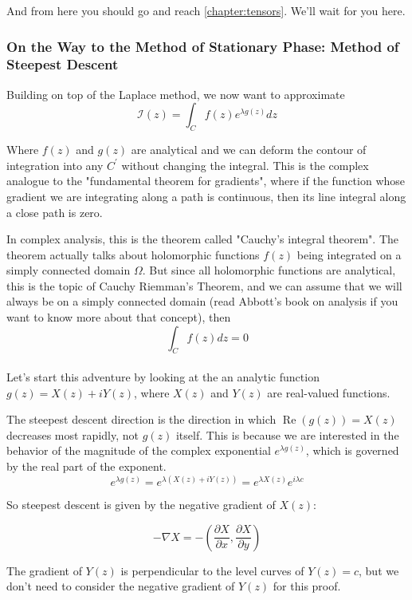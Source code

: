 And from here you should go and reach \ref{chapter:tensors}.
We'll wait for you here.




\subsubsection{On the Way to the Method of Stationary Phase: Method of Steepest Descent}

Building on top of the Laplace method, we now want to approximate
$$
\mathcal{I}(z) 
= \int_{C} f(z) e^{\lambda g(z)} dz
$$

Where $f(z)$ and $g(z)$ are analytical and we can deform the contour of integration
into any $C^\prime$ without changing the integral.
This is the complex analogue to the "fundamental theorem for gradients", where if the function whose gradient we are
integrating along a path is continuous, then its line integral along a close path is zero.

In complex analysis, this is the theorem called "Cauchy's integral theorem".
The theorem actually talks about holomorphic functions $f(z)$ being integrated on a simply connected
domain $\Omega$.
But since all holomorphic functions are analytical, this is the topic of Cauchy Riemman's Theorem,
and we can assume that we will always be on a simply connected domain (read Abbott's book on
analysis if you want to know more about that concept), then
$$
\int_{C} f(z) dz = 0
$$
\\



Let's start this adventure by looking at the an analytic function $g(z) = X(z) + iY(z)$,
where $X(z)$ and $Y(z)$ are real-valued functions.


The steepest descent direction is the direction in which $\operatorname{Re}(g(z)) = X(z)$
decreases most rapidly, not $g(z)$ itself.
This is because we are interested in the behavior of the magnitude of the complex exponential
$e^{\lambda g(z)}$, which is governed by the real part of the exponent.
$$
e^{\lambda g(z)} = e^{\lambda (X(z) + iY(z))} = e^{\lambda X(z)} e^{i\lambda c}
$$

So steepest descent is given by the negative gradient of $X(z)$:

$$
-\nabla X = -\left(\frac{\partial X}{\partial x}, \frac{\partial X}{\partial y}\right)
$$


The gradient of $Y(z)$ is perpendicular to the level curves of $Y(z) = c$,
but we don't need to consider the negative gradient of $Y(z)$ for this proof.




